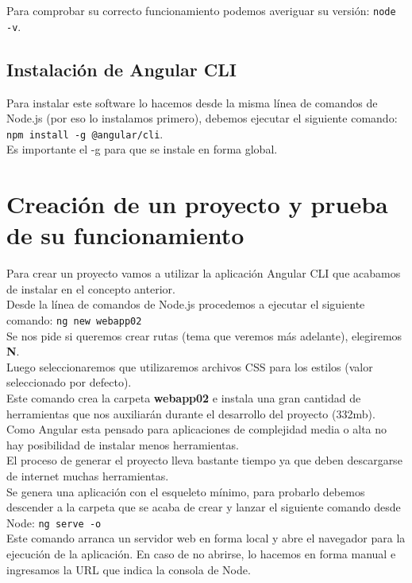 \documentclass[12pt]{book} %
\begin{document}
Para comprobar su correcto funcionamiento podemos averiguar su versión: \verb_node -v_.

\section{Instalación de Angular CLI}
Para instalar este software lo hacemos desde la misma línea de comandos de Node.js (por eso lo instalamos primero), debemos ejecutar el siguiente comando: \verb_npm install -g @angular/cli_.\\

Es importante el -g para que se instale en forma global.

\chapter{Creación de un proyecto y prueba de su funcionamiento}
Para crear un proyecto vamos a utilizar la aplicación Angular CLI que acabamos de instalar en el concepto anterior.\\

Desde la línea de comandos de Node.js procedemos a ejecutar el siguiente comando: \verb_ng new webapp02_\\
Se nos pide si queremos crear rutas (tema que veremos más adelante), elegiremos \textbf{N}.\\
Luego seleccionaremos que utilizaremos archivos CSS para los estilos (valor seleccionado por defecto).\\

Este comando crea la carpeta \textbf{webapp02} e instala una gran cantidad de herramientas que nos auxiliarán durante el desarrollo del proyecto (332mb). Como Angular esta pensado para aplicaciones de complejidad media o alta no hay posibilidad de instalar menos herramientas.\\

El proceso de generar el proyecto lleva bastante tiempo ya que deben descargarse de internet muchas herramientas.\\

Se genera una aplicación con el esqueleto mínimo, para probarlo debemos descender a la carpeta que se acaba de crear y lanzar el siguiente comando desde Node: \verb_ng serve -o_\\

Este comando arranca un servidor web en forma local y abre el navegador para la ejecución de la aplicación. En caso de no abrirse, lo hacemos en forma manual e ingresamos la URL que indica la consola de Node.\\
\end{document}
